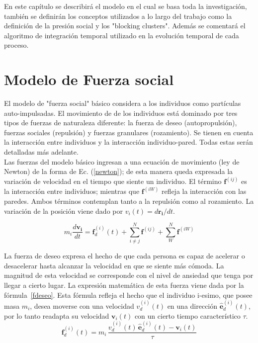 \label{marco_teo}

En este capítulo se describirá el modelo en el cual se basa toda la investigación, también se definirán los conceptos utilizados a lo largo del trabajo como la definición de la presión social y los "blocking clusters". Además se comentará el algoritmo de integración temporal utilizado en la evolución temporal de cada proceso. 

\section{\label{sfm}Modelo de Fuerza social}

El modelo de "fuerza social" básico considera a los individuos como partículas auto-impulsadas. El movimiento de de los individuos está dominado por tres tipos de fuerzas de naturaleza diferente: la fuerza de deseo (autopropulsión), fuerzas sociales (repulsión) y fuerzas granulares (rozamiento). Se tienen en cuenta la interacción entre individuos y la interacción individuo-pared. Todas estas serán detalladas más adelante.   \\

Las fuerzas del modelo básico ingresan a una ecuación de movimiento (ley de Newton) de la forma de Ec. (\ref{newton}); de esta manera queda expresada la variación de velocidad en el tiempo que siente un individuo. El término $\mathbf{f}^{(ij)}$ es la interacción entre individuos; mientras que $\mathbf{f}^{(iW)}$ refleja la interacción con las paredes. Ambos términos contemplan tanto a la repulsión como al rozamiento. La variación de la  posición viene dado por $v_{i}(t)=d\mathbf{r_i}/dt$.

\begin{equation}
m_i\frac{d\mathbf{v_i}}{dt}=\mathbf{f}_d^ {(i)}(t)+ \sum_{i\neq j}^{N}\mathbf{f}^{(ij)} + \sum_{W}^{N}\mathbf{f}^{(iW)}
\label{newton}
\end{equation} 

La fuerza de deseo expresa el hecho de que cada persona es capaz de  acelerar o desacelerar hasta alcanzar la velocidad en que se siente más cómoda. La magnitud de esta velocidad se corresponde con el nivel de ansiedad que tenga por llegar a cierto lugar. La expresión matemática de esta fuerza viene dada por la fórmula~\ref{fdeseo}. Esta fórmula refleja el hecho que el individuo i-esimo, que posee masa $m_i$, desea  moverse con una velocidad $v_d^ {(i)}(t)$ en una dirección $\hat{\mathbf{e}}_d^ {(i)}(t)$, por lo tanto readapta su velocidad $\mathbf{v}_i(t)$ con un cierto tiempo característico $\tau$.
\begin{equation}
\mathbf{f}_d^ {(i)}(t)=m_i\,\displaystyle\frac{v_d^ {(i)}(t)\,\hat{\mathbf{e}}_d^ {(i)}(t)-\mathbf{v}_i(t)}{\tau}\label{fdeseo}
\end{equation}

